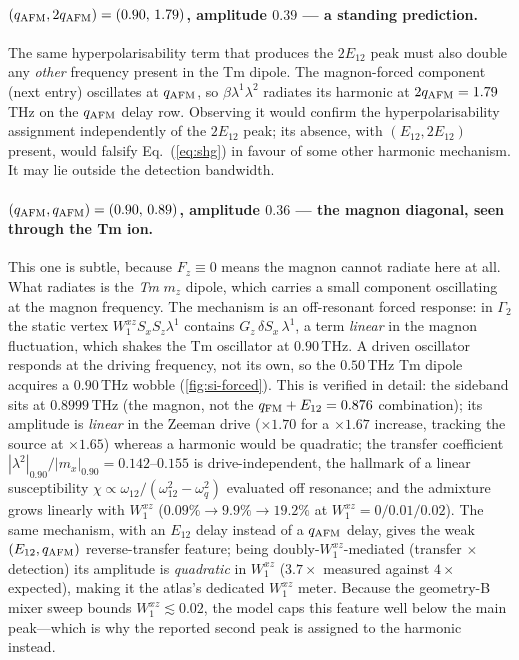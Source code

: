 \documentclass[11pt]{article}
\newcommand{\qafm}{q_{\rm AFM}}
\newcommand{\qfm}{q_{\rm FM}}
\begin{document}
\paragraph{$(\qafm,2\qafm)=(0.90,\,1.79)$, amplitude $0.39$ --- a
standing prediction.}
The same hyperpolarisability term that produces the $2E_{12}$ peak must
also double any \emph{other} frequency present in the Tm dipole.  The
magnon-forced component (next entry) oscillates at $\qafm$, so
$\beta\lambda^1\lambda^2$ radiates its harmonic at $2\qafm=1.79$\,THz
on the $\qafm$ delay row.  Observing it would confirm the
hyperpolarisability assignment independently of the $2E_{12}$ peak;
its absence, with $(E_{12},2E_{12})$ present, would falsify
Eq.~(\ref{eq:shg}) in favour of some other harmonic mechanism.  It may
lie outside the detection bandwidth.

\paragraph{$(\qafm,\qafm)=(0.90,\,0.89)$, amplitude $0.36$ --- the
magnon diagonal, seen through the Tm ion.}
This one is subtle, because $F_z\equiv0$ means the magnon cannot
radiate here at all.  What radiates is the \emph{Tm} $m_z$ dipole,
which carries a small component oscillating at the magnon frequency.
The mechanism is an off-resonant forced response: in $\Gamma_2$ the
static vertex $W^{xz}_1S_xS_z\lambda^1$ contains
$G_z\,\delta S_x\,\lambda^1$, a term \emph{linear} in the magnon
fluctuation, which shakes the Tm oscillator at $0.90$\,THz.  A driven
oscillator responds at the driving frequency, not its own, so the
$0.50$\,THz Tm dipole acquires a $0.90$\,THz wobble
(\cref{fig:si-forced}).  This is verified in detail: the sideband sits
at $0.8999$\,THz (the magnon, not the $\qfm+E_{12}=0.876$
combination); its amplitude is \emph{linear} in the Zeeman drive
($\times1.70$ for a $\times1.67$ increase, tracking the source at
$\times1.65$) whereas a harmonic would be quadratic; the transfer
coefficient $|\lambda^2|_{0.90}/|m_x|_{0.90}=0.142$--$0.155$ is
drive-independent, the hallmark of a linear susceptibility
$\chi\propto\omega_{12}/(\omega_{12}^2-\omega_q^2)$ evaluated off
resonance; and the admixture grows linearly with $W^{xz}_1$
($0.09\%\to9.9\%\to19.2\%$ at $W^{xz}_1=0/0.01/0.02$).
The same mechanism, with an $E_{12}$ delay instead of a $\qafm$ delay,
gives the weak $(E_{12},\qafm)$ reverse-transfer feature; being
doubly-$W^{xz}_1$-mediated (transfer $\times$ detection) its amplitude
is \emph{quadratic} in $W^{xz}_1$ ($3.7\times$ measured against
$4\times$ expected), making it the atlas's dedicated $W^{xz}_1$ meter.
Because the geometry-B mixer sweep bounds $W^{xz}_1\lesssim0.02$, the
model caps this feature well below the main peak---which is why the
reported second peak is assigned to the harmonic instead.
\end{document}
